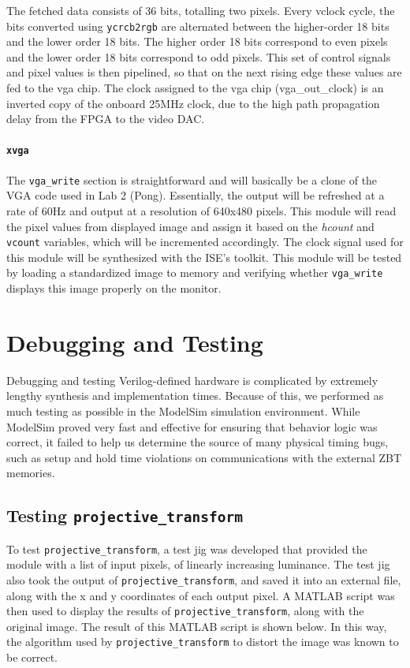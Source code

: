 \documentclass[10pt]{article}
\begin{document}
The fetched data consists of 36 bits, totalling two pixels. Every vclock cycle, the bits converted using {\tt ycrcb2rgb} are alternated between the higher-order 18 bits and the lower order 18 bits. The higher order 18 bits correspond to even pixels and the lower order 18 bits correspond to odd pixels. This set of control signals and pixel values is then pipelined, so that on the next rising edge these values are fed to the vga chip. The clock assigned to the vga chip (vga\_out\_clock) is an inverted copy of the onboard 25MHz clock, due to the high path propagation delay from the FPGA to the video DAC.

\paragraph{{\tt xvga}}


The {\tt vga\_write} section is straightforward and will basically be a clone of the VGA code used in Lab 2 (Pong). Essentially, the output will be refreshed at a rate of 60Hz and output at a resolution of 640x480 pixels. This module will read the pixel values from displayed image and assign it based on the {\it hcount} and {\tt vcount} variables, which will be incremented accordingly. The clock signal used for this module will be synthesized with the ISE's toolkit. This module will be tested by loading a standardized image to memory and verifying whether {\tt vga\_write} displays this image properly on the monitor.

\section{Debugging and Testing}

Debugging and testing Verilog-defined hardware is complicated by extremely lengthy synthesis and implementation times. Because of this, we performed as much testing as possible in the ModelSim simulation environment. While ModelSim proved very fast and effective for ensuring that behavior logic was correct, it failed to help us determine the source of many physical timing bugs, such as setup and hold time violations on communications with the external ZBT memories.

\subsection{Testing {\tt projective\_transform}}

To test {\tt projective\_transform}, a test jig was developed that provided the module with a list of input pixels, of linearly increasing luminance. The test jig also took the output of {\tt projective\_transform}, and saved it into an external file, along with the x and y coordinates of each output pixel. A MATLAB script was then used to display the results of {\tt projective\_transform}, along with the original image. The result of this MATLAB script is shown below. In this way, the algorithm used by {\tt projective\_transform} to distort the image was known to be correct.
\end{document}
